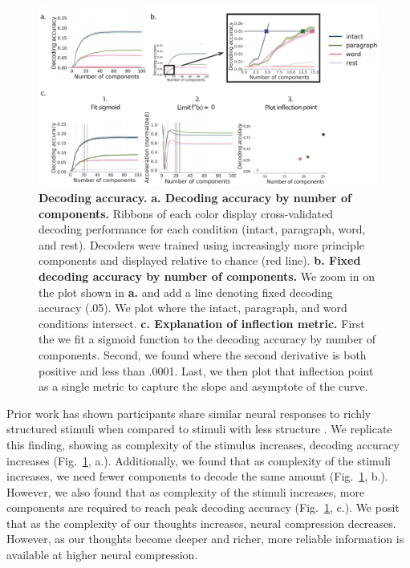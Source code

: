 \documentclass[english]{article}
\begin{document}
\begin{figure}
  \centering
  \includegraphics[width=\textwidth]{figs/decode_interpret.pdf}
  \caption{\textbf{Decoding accuracy.} \textbf{a. Decoding accuracy by
      number of components.} Ribbons of each color display
    cross-validated decoding performance for each condition (intact,
    paragraph, word, and rest). Decoders were trained using
    increasingly more principle components and displayed relative to
    chance (red line). \textbf{b. Fixed decoding accuracy by number of
      components.} We zoom in on the plot shown in \textbf{a.} and add
    a line denoting fixed decoding accuracy (.05). We plot where the
    intact, paragraph, and word conditions intersect.
    \textbf{c. Explanation of inflection metric.} First the we fit a sigmoid function to the decoding accuracy by number of components. Second, we found where the second derivative is both positive and less than .0001. Last, we then plot that inflection point as a single metric to capture the slope and asymptote of the curve.}
    \label{fig:decode_interpret}
  \end{figure}



Prior work has shown participants share similar neural responses to
richly structured stimuli when compared to stimuli with less
structure \cite{SimoEtal16}.  We replicate this finding, showing as complexity of the stimulus increases, decoding accuracy
increases (Fig.~\ref{fig:decode_interpret},  a.).  
Additionally, we found that as complexity of the stimuli increases, we need fewer components to decode the same amount (Fig.~\ref{fig:decode_interpret},  b.). However, we also found that as complexity of the stimuli increases, more components are required to reach peak decoding accuracy (Fig.~\ref{fig:decode_interpret},  c.).  
We posit that as the complexity of our thoughts increases, neural
compression decreases. However, as our thoughts become deeper and richer, more reliable information is available at higher neural compression.
\end{document}

